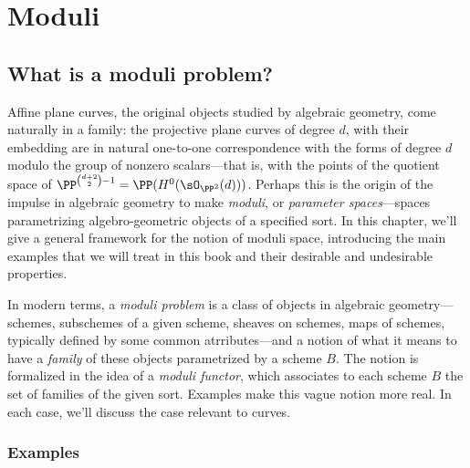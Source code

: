 

\chapter{Moduli} 
\label{Moduli chapter}\label{ModuliChapter}

\section{What is a moduli problem?}

Affine plane curves, the original objects studied by algebraic geometry, come naturally in a family: the projective plane curves of degree $d$, with their embedding
are in natural one-to-one correspondence with the forms of degree $d$ modulo the group of nonzero scalars---that is, with the points of the quotient space
of 
$\PP^{\binom{d+2}{2}-1} = \PP(H^0(\sO_{\PP^2}(d)))$.
Perhaps this is the origin of the impulse in algebraic geometry to make 
 \emph{moduli}, or \emph{parameter spaces}---spaces parametrizing algebro-geometric objects of a specified sort. In this chapter, we'll give a general framework for the notion of moduli space, introducing the main examples that we will treat in this book and their desirable and undesirable properties.

In modern terms, a \emph{moduli problem} is a class of objects in algebraic geometry---schemes, subschemes of a given scheme, sheaves on schemes, maps of schemes, typically defined by some common atrributes---and a notion of what it means to have a \emph{family} of these objects parametrized by a scheme $B$. The notion is formalized in the idea of a \emph{moduli functor}, 
which associates to each scheme $B$ the set of families of the given sort. Examples make this vague notion more real. In each case, we'll discuss the case relevant to curves.

\subsection{Examples}


